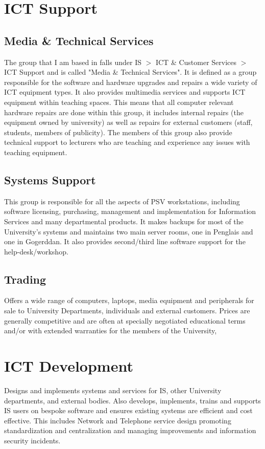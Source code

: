 \documentclass[10pt,a4paper,headinclude=true]{report}
\begin{document}
\section{ICT Support}
\subsection{Media \& Technical Services}
The group that I am based in falls under IS $>$ ICT \& Customer Services $>$ ICT Support and is called "Media \& Technical Services". It is defined as a group responsible for the software and hardware upgrades and repairs a wide variety of ICT equipment types. It also provides multimedia services and supports ICT equipment within teaching spaces. This means that all computer relevant hardware repairs are done within this group, it includes internal repairs (the equipment owned by university) as well as repairs for external customers (staff, students, members of publicity). The members of this group also provide technical support to lecturers who are teaching and experience any issues with teaching equipment.

\subsection{Systems Support}
This group is responsible for all the aspects of PSV workstations, including software licensing, purchasing, management and implementation for Information Services and many departmental products. It makes backups for most of the University's systems and maintains two main server rooms, one in Penglais and one in Gogerddan. It also provides second/third line software support for the help-desk/workshop.
\subsection{Trading}
Offers a wide range of computers, laptops, media equipment and peripherals for sale to University Departments, individuals and external customers. Prices are generally competitive and are often at specially negotiated educational terms and/or with extended warranties for the members of the University,
\section{ICT Development}
Designs and implements systems and services for IS, other University departments, and external bodies. Also develops, implements, trains and supports IS users on bespoke software and ensures existing systems are efficient and cost effective. This includes Network and Telephone service design promoting standardization and centralization and managing improvements and information security incidents.
\end{document}
